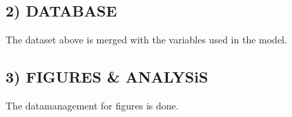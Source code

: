 \documentclass[12,twoside]{article}
\begin{document}
\subsection{2) DATABASE}\label{database}

The dataset above is merged with the variables used in the model.

\subsection{3) FIGURES \& ANALYSiS}\label{figures-analysis}

The datamanagement for figures is done.
\end{document}
